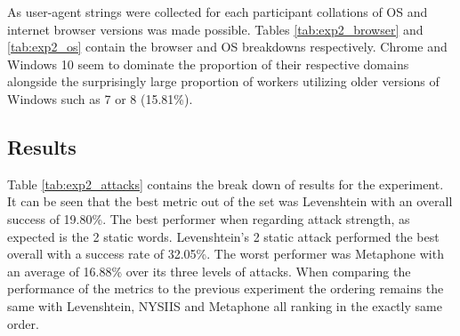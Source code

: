     
As user-agent strings were collected for each participant collations of OS and internet browser versions was made possible. Tables \ref{tab:exp2_browser} and \ref{tab:exp2_os} contain the browser and OS breakdowns respectively. Chrome and Windows 10 seem to dominate the proportion of their respective domains alongside the surprisingly large proportion of workers utilizing older versions of Windows such as 7 or 8 (15.81\%).

\newpage

\subsection*{Results}
Table \ref{tab:exp2_attacks} contains the break down of results for the experiment. It can be seen that the best metric out of the set was Levenshtein with an overall success of 19.80\%. The best performer when regarding attack strength, as expected is the 2 static words. Levenshtein's 2 static attack performed the best overall with a success rate of 32.05\%. The worst performer was Metaphone with an average of 16.88\% over its three levels of attacks. When comparing the performance of the metrics to the previous experiment the ordering remains the same with Levenshtein, NYSIIS and Metaphone all ranking in the exactly same order.

